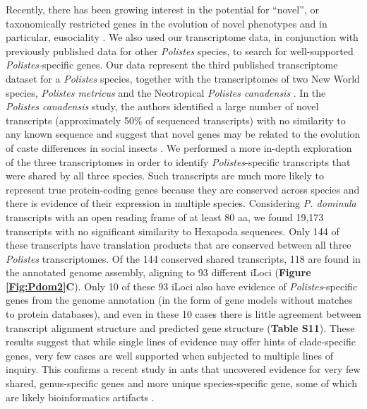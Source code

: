 Recently, there has been growing interest in the potential for
``novel'', or taxonomically restricted genes in the evolution of novel
phenotypes and in particular, eusociality \cite{SumnerTRG}. We also used our
transcriptome data, in conjunction with previously published data for
other \textit{Polistes} species, to search for well-supported
\textit{Polistes-}specific genes. Our data represent the third published
transcriptome dataset for a \textit{Polistes} species, together with the
transcriptomes of two New World species, \textit{Polistes metricus} \cite{Berens2015} and the
Neotropical \textit{Polistes canadensis} \cite{PcanTrans}. In
the \textit{Polistes canadensis} study, the authors identified a large
number of novel transcripts (approximately 50\% of sequenced
transcripts) with no similarity to any known sequence and suggest that
novel genes may be related to the evolution of caste differences in
social insects \cite{SumnerTRG}. We
performed a more in-depth exploration of the three transcriptomes in
order to identify \textit{Polistes}-specific transcripts that were shared
by all three species. Such transcripts are much more likely to represent
true protein-coding genes because they are conserved across species and
there is evidence of their expression in multiple species. Considering
\textit{P. dominula} transcripts with an open reading frame of at least 80
aa, we found 19,173 transcripts with no significant similarity to
Hexapoda sequences. Only 144 of these transcripts have translation
products that are conserved between all three \textit{Polistes}
transcriptomes. Of the 144 conserved shared transcripts, 118 are found
in the annotated genome assembly, aligning to 93 different iLoci
(\textbf{Figure \ref{Fig:Pdom2}C}). Only 10 of these 93 iLoci also have evidence of
\textit{Polistes}-specific genes from the genome annotation (in the form
of gene models without matches to protein databases), and even in these
10 cases there is little agreement between transcript alignment
structure and predicted gene structure (\textbf{Table S11}). These
results suggest that while single lines of evidence may offer hints of
clade-specific genes, very few cases are well supported when subjected
to multiple lines of inquiry. This confirms a recent study in ants that
uncovered evidence for very few shared, genus-specific genes and more
unique species-specific gene, some of which are likely bioinformatics
artifacts \cite{SimolaDiffExp}.

